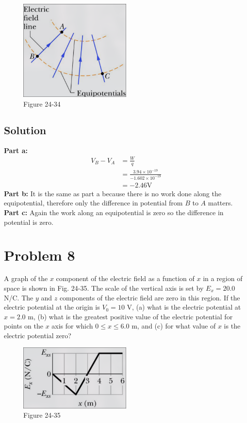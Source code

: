 \documentclass{article}
\newcommand{\V}{\text{V}}
\begin{document}
\begin{figure}[h]
	\centering
	\includegraphics[width=0.5\textwidth]{image-5.png}
	\caption{Figure 24-34}
\end{figure}

\subsection*{Solution}
\textbf{Part a:}
\begin{align*}
	V_B - V_A &= \frac{W}{q} \\
	&= \frac{3.94 \times 10^{-19}}{-1.602 \times 10^{-19}} \\
	&= \boxed{-2.46 \V}
\end{align*}
\textbf{Part b:} It is the same as part a because there is no work done along the equipotential, therefore only the difference in potential from $B$ to $A$ matters. \\[10pt]
\textbf{Part c:} Again the work along an equipotential is zero so the difference in potential is zero.

\section*{Problem 8}
A graph of the $x$ component of the electric field as a function of $x$ in a region of space is shown in Fig. 24-35. The scale of the vertical axis is set by $E_x = 20.0$ N/C. The $y$ and $z$ components of the electric field are zero in this region. If the electric potential at the origin is $V_0 = 10$ V, (a) what is the electric potential at $x = 2.0$ m, (b) what is the greatest positive value of the electric potential for points on the $x$ axis for which $0 \leq x \leq 6.0$ m, and (c) for what value of $x$ is the electric potential zero?

\begin{figure}[h]
	\centering
	\includegraphics[width=0.5\textwidth]{image-6.png}
	\caption{Figure 24-35}
\end{figure}
\end{document}
